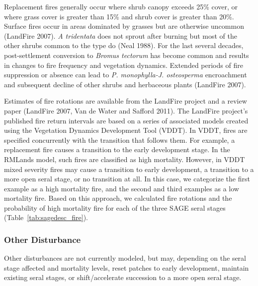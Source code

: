Replacement fires generally occur where shrub canopy exceeds 25\% cover, or where grass cover is greater than 15\% and shrub cover is greater than 20\%. Surface fires occur in areas dominated by grasses but are otherwise uncommon (LandFire 2007). \emph{A tridentata} does not sprout after burning but most of the other shrubs common to the type do (Neal 1988). For the last several decades, post-settlement conversion to \emph{Bromus tectorum} has become common and results in changes to fire frequency and vegetation dynamics. Extended periods of fire suppression or absence can lead to \emph{P. monophylla-J. osteosperma} encroachment and subsequent decline of other shrubs and herbaceous plants (LandFire 2007). 

Estimates of fire rotations are available from the LandFire project and a review paper (LandFire 2007, Van de Water and Safford 2011). The LandFire project’s published fire return intervals are based on a series of associated models created using the Vegetation Dynamics Development Tool (VDDT). In VDDT, fires are specified concurrently with the transition that follows them. For example, a replacement fire causes a transition to the early development stage. In the RMLands model, such fires are classified as high mortality. However, in VDDT mixed severity fires may cause a transition to early development, a transition to a more open seral stage, or no transition at all. In this case, we categorize the first example as a high mortality fire, and the second and third examples as a low mortality fire. Based on this approach, we calculated fire rotations and the probability of high mortality fire for each of the three SAGE seral stages (Table~\ref{tab:sagedesc_fire}). 

\subsubsection*{Other Disturbance}
Other disturbances are not currently modeled, but may, depending on the seral stage affected and mortality levels, reset patches to early development, maintain existing seral stages, or shift/accelerate succession to a more open seral stage. 

